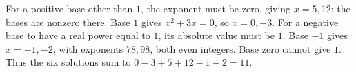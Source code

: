 For a positive base other than $1$, the exponent must be zero, giving $x=5,12$; the bases are nonzero there. Base $1$ gives $x^2+3x=0$, so $x=0,-3$. For a negative base to have a real power equal to $1$, its absolute value must be $1$. Base $-1$ gives $x=-1,-2$, with exponents $78,98$, both even integers. Base zero cannot give $1$. Thus the six solutions sum to $0-3+5+12-1-2=\boxed{11}$.

